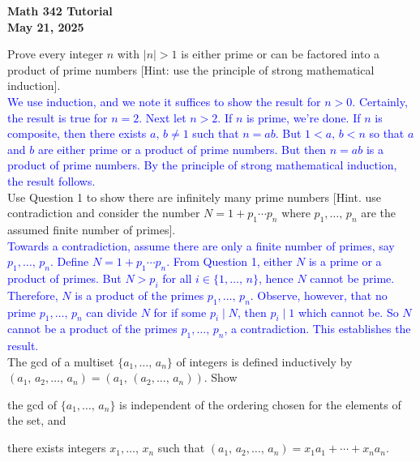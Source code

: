 \documentclass[a4paper,11pt]{article}
\theoremstyle{mythm}
\theoremstyle{mydef}
\newcommand{\blue}[1]{\textcolor{blue}{#1}}
\newcommand{\abs}[1]{\left\vert #1 \right\vert}
\begin{document}
\begin{center}
  {\Large\bfseries Math 342 Tutorial} \\
  {\normalsize\bf May 21, 2025}
\end{center}

 Prove every integer $n$ with $\abs{n}>1$ is either
prime or can be factored into a product of prime numbers [Hint: use the
principle of strong mathematical induction]. \\

\blue{We use induction, and we note it suffices to show the result for $n>0$.
Certainly, the result is true for $n=2$. Next let $n>2$. If $n$ is prime, we're
done. If $n$ is composite, then there exists $a,\,b \neq 1$ such that $n=ab$.
But $1<a,\,b < n$ so that $a$ and $b$ are either prime or a product of prime
numbers. But then $n=ab$ is a product of prime numbers. By the principle of
strong mathematical induction, the result follows.} \\

 Use Question 1 to show there are infinitely many
prime numbers [Hint. use contradiction and consider the number $N=1+p_1 \cdots
p_n$ where $p_1,\dots,\,p_n$ are the assumed finite number of primes]. \\

\blue{Towards a contradiction, assume there are only a finite number of primes,
  say $p_1,\dots,\,p_n$. Define $N=1+p_1 \cdots p_n$. From Question 1, either
  $N$ is a prime or a product of primes. But $N>p_i$ for all $i \in
  \{1,\dots,\,n\}$, hence $N$ cannot be prime. Therefore, $N$ is a product of
  the primes $p_1,\dots,\,p_n$. Observe, however, that no prime
  $p_1,\dots,\,p_n$ can divide $N$ for if some $p_i \mid N$, then $p_i \mid 1$
  which cannot be. So $N$ cannot be a product of the primes
  $p_1,\dots,\,p_n$, a contradiction. This establishes the result.} \\

 The gcd of a multiset $\{a_1,\dots,\,a_n\}$ of
integers is defined inductively by
$(a_1,\,a_2,\dots,\,a_n)=(a_1,\,(a_2,\dots,\,a_n))$. Show
\begin{enumerate*}[{\bf (a)}]
\item the gcd of $\{a_1,\dots,\,a_n\}$ is independent of the ordering chosen for
  the elements of the set, and
\item there exists integers $x_1,\dots,\,x_n$ such that $(a_1,\,a_2,\dots,\,a_n)
  = x_1a_1 + \cdots + x_na_n$.
\end{enumerate*} \\
\end{document}
